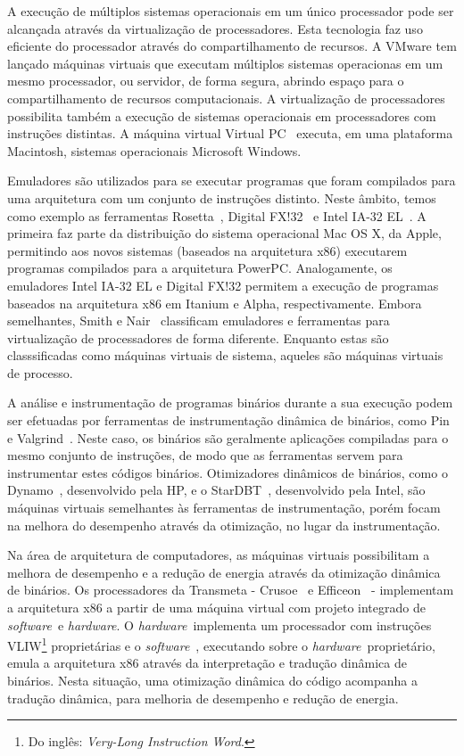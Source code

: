 \documentclass[a4paper,12pt]{article}
\newcommand{\software}{\emph{software}}
\newcommand{\hardware}{\emph{hardware}}
\begin{document}
A execução de múltiplos sistemas operacionais em um único processador pode ser
alcançada através da virtualização de processadores. Esta tecnologia faz uso
eficiente do processador através do compartilhamento de recursos. A VMware tem
lançado máquinas virtuais que executam múltiplos sistemas operacionas em um
mesmo processador, ou servidor, de forma segura, abrindo espaço para o
compartilhamento de recursos computacionais. A virtualização de processadores
possibilita também a execução de sistemas operacionais em processadores com
instruções distintas. A máquina virtual Virtual PC~\cite{pc} executa, em uma
plataforma Macintosh, sistemas operacionais Microsoft Windows.

Emuladores são utilizados para se executar programas que foram compilados para
uma arquitetura com um conjunto de instruções distinto. Neste âmbito, temos como
exemplo as ferramentas Rosetta~\cite{rosetta}, Digital FX!32~\cite{fx} e Intel
IA-32 EL~\cite{intel}. A primeira faz parte da distribuição do sistema
operacional Mac OS X, da Apple, permitindo aos novos sistemas (baseados na
arquitetura x86) executarem programas compilados para a arquitetura
PowerPC. Analogamente, os emuladores Intel IA-32 EL e Digital FX!32 permitem a
execução de programas baseados na arquitetura x86 em Itanium e Alpha,
respectivamente. Embora semelhantes, Smith e Nair~\cite{smith_nair_1}
classificam emuladores e ferramentas para virtualização de processadores de
forma diferente. Enquanto estas são classsificadas como máquinas virtuais de
sistema, aqueles são máquinas virtuais de processo.

A análise e instrumentação de programas binários durante a sua execução podem
ser efetuadas por ferramentas de instrumentação dinâmica de binários, como
Pin~\cite{pin} e Valgrind~\cite{val}. Neste caso, os binários são geralmente
aplicações compiladas para o mesmo conjunto de instruções, de modo que as
ferramentas servem para instrumentar estes códigos binários. Otimizadores
dinâmicos de binários, como o Dynamo~\cite{dyn}, desenvolvido pela HP, e o
StarDBT~\cite{star}, desenvolvido pela Intel, são máquinas virtuais semelhantes
às ferramentas de instrumentação, porém focam na melhora do desempenho através
da otimização, no lugar da instrumentação.

Na área de arquitetura de computadores, as máquinas virtuais possibilitam a
melhora de desempenho e a redução de energia através da otimização dinâmica de
binários. Os processadores da Transmeta - Crusoe~\cite{halfhill} e
Efficeon~\cite{Kre03} - implementam a arquitetura x86 a partir de uma máquina
virtual com projeto integrado de \software\ e \hardware. O \hardware\ implementa
um processador com instruções VLIW\footnote{Do inglês: \emph{Very-Long
    Instruction Word}.} proprietárias e o \software~\cite{soft}, executando
sobre o \hardware\ proprietário, emula a arquitetura x86 através da
interpretação e tradução dinâmica de binários. Nesta situação, uma otimização
dinâmica do código acompanha a tradução dinâmica, para melhoria de desempenho e
redução de energia.
\end{document}
